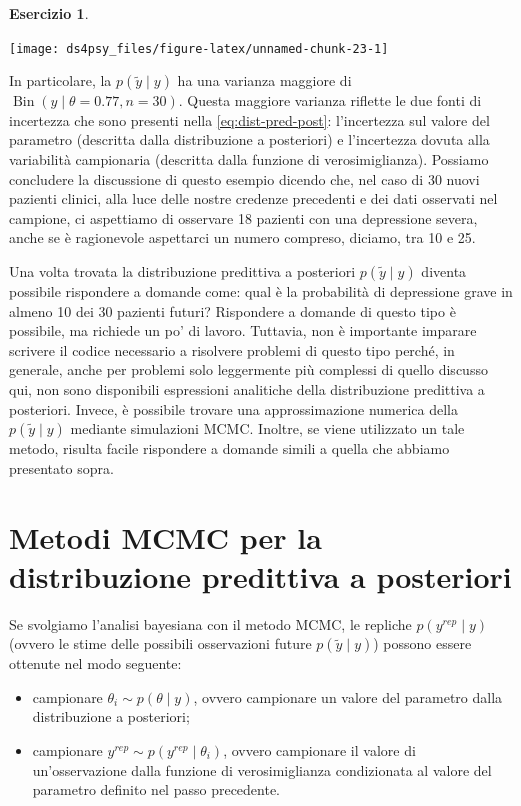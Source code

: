 \documentclass[
  11pt,
]{krantz}
\providecommand{\tightlist}{%
  \setlength{\itemsep}{0pt}\setlength{\parskip}{0pt}}
\DeclareMathOperator{\Bin}{Bin} %
\theoremstyle{definition}
\theoremstyle{definition}
\theoremstyle{definition}
\newtheorem{exercise}{Esercizio}[chapter]
\theoremstyle{definition}
\theoremstyle{remark}
\begin{document}
\begin{exercise}
\begin{center}\texttt{[image: ds4psy\_files/figure-latex/unnamed-chunk-23-1]} \end{center}

\noindent In particolare, la \(p(\tilde{y} \mid y)\) ha una varianza maggiore di \(\Bin(y \mid \theta = 0.77, n = 30)\). Questa maggiore varianza riflette le due fonti di incertezza che sono presenti nella \eqref{eq:dist-pred-post}: l'incertezza sul valore del parametro (descritta dalla distribuzione a posteriori) e l'incertezza dovuta alla variabilità campionaria (descritta dalla funzione di verosimiglianza). Possiamo concludere la discussione di questo esempio dicendo che, nel caso di 30 nuovi pazienti clinici, alla luce delle nostre credenze precedenti e dei dati osservati nel campione, ci aspettiamo di osservare 18 pazienti con una depressione severa, anche se è ragionevole aspettarci un numero compreso, diciamo, tra 10 e 25.

Una volta trovata la distribuzione predittiva a posteriori \(p(\tilde{y} \mid y)\) diventa possibile rispondere a domande come: qual è la probabilità di depressione grave in almeno 10 dei 30 pazienti futuri? Rispondere a domande di questo tipo è possibile, ma richiede un po' di lavoro. Tuttavia, non è importante imparare scrivere il codice necessario a risolvere problemi di questo tipo perché, in generale, anche per problemi solo leggermente più complessi di quello discusso qui, non sono disponibili espressioni analitiche della distribuzione predittiva a posteriori. Invece, è possibile trovare una approssimazione numerica della \(p(\tilde{y} \mid y)\) mediante simulazioni MCMC. Inoltre, se viene utilizzato un tale metodo, risulta facile rispondere a domande simili a quella che abbiamo presentato sopra.
\end{exercise}

\hypertarget{metodi-mcmc-per-la-distribuzione-predittiva-a-posteriori}{%
\section{Metodi MCMC per la distribuzione predittiva a posteriori}\label{metodi-mcmc-per-la-distribuzione-predittiva-a-posteriori}}

Se svolgiamo l'analisi bayesiana con il metodo MCMC, le repliche \(p(y^{rep} \mid y)\) (ovvero le stime delle possibili osservazioni future \(p(\tilde{y} \mid y)\)) possono essere ottenute nel modo seguente:

\begin{itemize}
\tightlist
\item
  campionare \(\theta_i \sim p(\theta \mid y)\), ovvero campionare un valore del parametro dalla distribuzione a posteriori;
\item
  campionare \(y^{rep} \sim p(y^{rep} \mid \theta_i)\), ovvero campionare il valore di un'osservazione dalla funzione di verosimiglianza condizionata al valore del parametro definito nel passo precedente.
\end{itemize}
\end{document}
